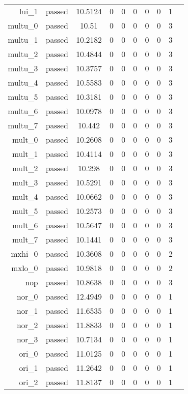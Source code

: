 \begin{longtable}{r|ccccccccc}
    lui\_1 & passed & 10.5124 & 0 & 0 & 0 & 0 & 0 & 1 \\
    multu\_0 & passed & 10.51 & 0 & 0 & 0 & 0 & 0 & 3 \\
    multu\_1 & passed & 10.2182 & 0 & 0 & 0 & 0 & 0 & 3 \\
    multu\_2 & passed & 10.4844 & 0 & 0 & 0 & 0 & 0 & 3 \\
    multu\_3 & passed & 10.3757 & 0 & 0 & 0 & 0 & 0 & 3 \\
    multu\_4 & passed & 10.5583 & 0 & 0 & 0 & 0 & 0 & 3 \\
    multu\_5 & passed & 10.3181 & 0 & 0 & 0 & 0 & 0 & 3 \\
    multu\_6 & passed & 10.0978 & 0 & 0 & 0 & 0 & 0 & 3 \\
    multu\_7 & passed & 10.442 & 0 & 0 & 0 & 0 & 0 & 3 \\
    mult\_0 & passed & 10.2608 & 0 & 0 & 0 & 0 & 0 & 3 \\
    mult\_1 & passed & 10.4114 & 0 & 0 & 0 & 0 & 0 & 3 \\
    mult\_2 & passed & 10.298 & 0 & 0 & 0 & 0 & 0 & 3 \\
    mult\_3 & passed & 10.5291 & 0 & 0 & 0 & 0 & 0 & 3 \\
    mult\_4 & passed & 10.0662 & 0 & 0 & 0 & 0 & 0 & 3 \\
    mult\_5 & passed & 10.2573 & 0 & 0 & 0 & 0 & 0 & 3 \\
    mult\_6 & passed & 10.5647 & 0 & 0 & 0 & 0 & 0 & 3 \\
    mult\_7 & passed & 10.1441 & 0 & 0 & 0 & 0 & 0 & 3 \\
    mxhi\_0 & passed & 10.3608 & 0 & 0 & 0 & 0 & 0 & 2 \\
    mxlo\_0 & passed & 10.9818 & 0 & 0 & 0 & 0 & 0 & 2 \\
    nop & passed & 10.8638 & 0 & 0 & 0 & 0 & 0 & 3 \\
    nor\_0 & passed & 12.4949 & 0 & 0 & 0 & 0 & 0 & 1 \\
    nor\_1 & passed & 11.6535 & 0 & 0 & 0 & 0 & 0 & 1 \\
    nor\_2 & passed & 11.8833 & 0 & 0 & 0 & 0 & 0 & 1 \\
    nor\_3 & passed & 10.7134 & 0 & 0 & 0 & 0 & 0 & 1 \\
    ori\_0 & passed & 11.0125 & 0 & 0 & 0 & 0 & 0 & 1 \\
    ori\_1 & passed & 11.2642 & 0 & 0 & 0 & 0 & 0 & 1 \\
    ori\_2 & passed & 11.8137 & 0 & 0 & 0 & 0 & 0 & 1 \\

\end{longtable}
